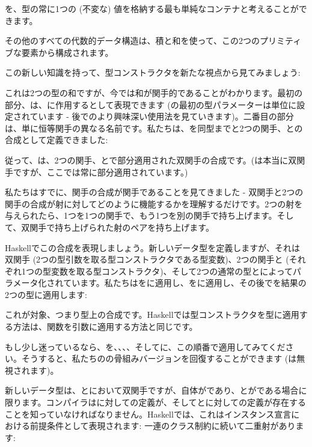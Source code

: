 を、型の常に1つの (不変な) 値を格納する最も単純なコンテナと考えることができます。

その他のすべての代数的データ構造は、積と和を使って、この2つのプリミティブな要素から構成されます。

この新しい知識を持って、型コンストラクタを新たな視点から見てみましょう: 

これは2つの型の和ですが、今では和が関手的であることがわかります。最初の部分、は、に作用するとして表現できます (の最初の型パラメーターは単位に設定されています - 後でのより興味深い使用法を見ていきます)。二番目の部分は、単に恒等関手の異なる名前です。私たちは、を同型までと2つの関手、との合成として定義できました: 

従って、は、2つの関手、とで部分適用された双関手の合成です。(は本当に双関手ですが、ここでは常に部分適用されています。) 

私たちはすでに、関手の合成が関手であることを見てきました - 双関手と2つの関手の合成が射に対してどのように機能するかを理解するだけです。2つの射を与えられたら、1つを1つの関手で、もう1つを別の関手で持ち上げます。そして、双関手で持ち上げられた射のペアを持ち上げます。

Haskellでこの合成を表現しましょう。新しいデータ型を定義しますが、それは双関手 (2つの型引数を取る型コンストラクタである型変数)、2つの関手と (それぞれ1つの型変数を取る型コンストラクタ)、そして2つの通常の型とによってパラメータ化されています。私たちはをに適用し、をに適用し、その後でを結果の2つの型に適用します: 

これが対象、つまり型上の合成です。Haskellでは型コンストラクタを型に適用する方法は、関数を引数に適用する方法と同じです。

もし少し迷っているなら、を、、、、そしてに、この順番で適用してみてください。そうすると、私たちのの骨組みバージョンを回復することができます (は無視されます)。

新しいデータ型は、とにおいて双関手ですが、自体がであり、とがである場合に限ります。コンパイラはに対しての定義が、そしてとに対しての定義が存在することを知っていなければなりません。Haskellでは、これはインスタンス宣言における前提条件として表現されます: 一連のクラス制約に続いて二重射があります: 

